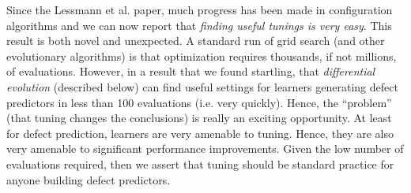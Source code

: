 \documentclass[final,twocolumn,5p]{elsarticle}
\begin{document}




Since the Lessmann et al. paper, much progress has been made in 
configuration algorithms
and we can now report that  {\em finding useful tunings is very easy}.
This result is both novel and unexpected.
A standard run of grid search (and other  evolutionary algorithms)
is  that optimization requires   thousands,
if not millions, of evaluations.  However, in a result that we found startling, that  {\em differential evolution} (described below) can find useful settings for learners generating defect predictors
in less than 100 evaluations (i.e. very quickly).
Hence,   the ``problem'' (that
tuning changes the conclusions) is really
an exciting opportunity. At least for defect prediction,
 learners are very   amenable to tuning. Hence, 
 they are  also very
amenable to significant performance improvements. Given the low
number of evaluations required, then we assert that tuning
  should be standard practice
for anyone building defect predictors.



 
\end{document}
